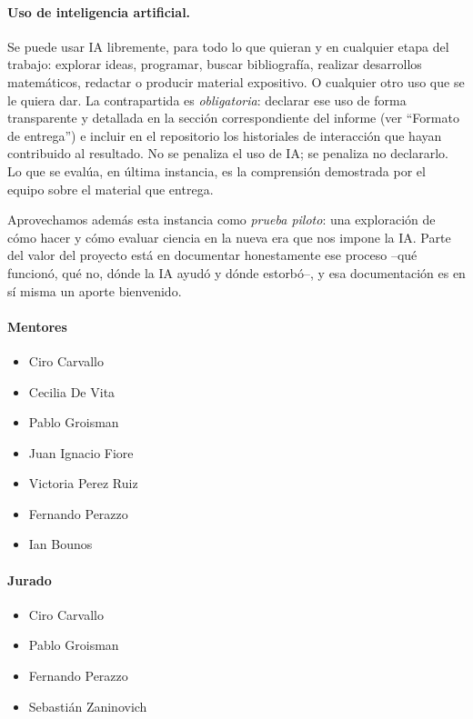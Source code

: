 \documentclass[11pt,a4paper]{article}
\begin{document}
\paragraph{Uso de inteligencia artificial.}
Se puede usar IA libremente, para todo lo que quieran y en cualquier etapa del trabajo: explorar ideas, programar, buscar bibliografía, realizar desarrollos matemáticos, redactar o producir material expositivo. O cualquier otro uso que se le quiera dar. La contrapartida es \emph{obligatoria}: declarar ese uso de forma transparente y detallada en la sección correspondiente del informe (ver ``Formato de entrega'') e incluir en el repositorio los historiales de interacción que hayan contribuido al resultado. No se penaliza el uso de IA; se penaliza no declararlo. Lo que se evalúa, en última instancia, es la comprensión demostrada por el equipo sobre el material que entrega.

Aprovechamos además esta instancia como \emph{prueba piloto}: una exploración de cómo hacer y cómo evaluar ciencia en la nueva era que nos impone la IA. Parte del valor del proyecto está en documentar honestamente ese proceso --qué funcionó, qué no, dónde la IA ayudó y dónde estorbó--, y esa documentación es en sí misma un aporte bienvenido.

\paragraph{Mentores}
\begin{itemize}
 \item Ciro Carvallo
 \item Cecilia De Vita
 \item Pablo Groisman
 \item Juan Ignacio Fiore
 \item Victoria Perez Ruiz
 \item Fernando Perazzo
 \item Ian Bounos
\end{itemize}

\paragraph{Jurado}
\begin{itemize}
 \item Ciro Carvallo
 \item Pablo Groisman
 \item Fernando Perazzo
 \item Sebastián Zaninovich
\end{itemize}
\end{document}
